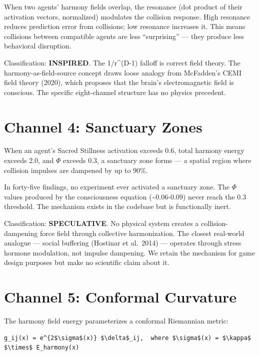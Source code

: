 When two agents' harmony fields overlap, the resonance (dot product of their activation vectors, normalized) modulates the collision response. High resonance reduces prediction error from collisions; low resonance increases it. This means collisions between compatible agents are less ``surprising'' --- they produce less behavioral disruption.

Classification: \textbf{INSPIRED}. The 1/r\^{}(D-1) falloff is correct field theory. The harmony-as-field-source concept draws loose analogy from McFadden's CEMI field theory (2020), which proposes that the brain's electromagnetic field is conscious. The specific eight-channel structure has no physics precedent.

\section{Channel 4: Sanctuary Zones}\label{channel-4-sanctuary-zones}

When an agent's Sacred Stillness activation exceeds 0.6, total harmony energy exceeds 2.0, and $\Phi$ exceeds 0.3, a sanctuary zone forms --- a spatial region where collision impulses are dampened by up to 90\%.

In forty-five findings, no experiment ever activated a sanctuary zone. The $\Phi$ values produced by the consciousness equation (\textasciitilde0.06-0.09) never reach the 0.3 threshold. The mechanism exists in the codebase but is functionally inert.

Classification: \textbf{SPECULATIVE}. No physical system creates a collision-dampening force field through collective harmonization. The closest real-world analogue --- social buffering (Hostinar et al.~2014) --- operates through stress hormone modulation, not impulse dampening. We retain the mechanism for game design purposes but make no scientific claim about it.

\section{Channel 5: Conformal Curvature}\label{channel-5-conformal-curvature}

The harmony field energy parameterizes a conformal Riemannian metric:

\begin{verbatim}
g_ij(x) = e^{2$\sigma$(x)} $\delta$_ij,  where $\sigma$(x) = $\kappa$ $\times$ E_harmony(x)
\end{verbatim}

